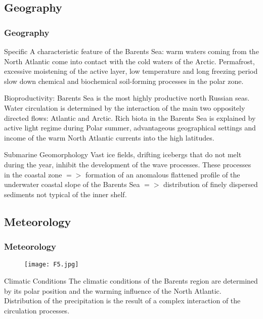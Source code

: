 \documentclass[pdflatex,compress,8pt,
	xcolor={dvipsnames,dvipsnames,svgnames,x11names,table},
	hyperref={	
	breaklinks = true, 
	pdfauthor={Lemenkova Polina}, 
	pdfsubject={Presentation}, 
	pdfcreator={Lemenkova Polina}, 
	pdfproducer={Lemenkova Polina}, 
	colorlinks=true,
	linkcolor=NavyBlue, 
	citecolor=NavyBlue, 
	urlcolor = NavyBlue, 
	breaklinks = true}]{beamer}
\begin{document}
\subsection{Geography}
\begin{frame}\frametitle{Geography}

\begin{block}{Specific}
A characteristic feature of the Barents Sea: warm waters coming from the North Atlantic come into contact with the cold waters of the Arctic. Permafrost, excessive moistening of the active layer, low temperature and long freezing period slow down chemical and biochemical soil-forming processes in the polar zone.
\end{block}

\begin{examples}{Bioproductivity:}
Barents Sea is the most highly productive north Russian seas. Water circulation is determined by the interaction of the main two oppositely directed flows: Atlantic and Arctic. Rich biota in the Barents Sea is explained by active light regime during Polar summer, advantageous geographical settings and income of the warm North Atlantic currents into the high latitudes.
\end{examples}

\begin{alertblock}{Submarine Geomorphology}
Vast ice fields, drifting icebergs that do not melt during the year, inhibit the development of the wave processes.
These processes in the coastal zone $=>$ formation of an \alert{anomalous flattened profile} of the underwater coastal slope of the Barents Sea $=>$ distribution of finely dispersed sediments not typical of the inner shelf.
\end{alertblock}

\end{frame}

\subsection{Meteorology}
\begin{frame}\frametitle{Meteorology}
\begin{figure}[H]
	\centering
		\texttt{[image: F5.jpg]}
\end{figure}

\begin{alertblock}{Climatic Conditions}
The climatic conditions of the Barents region are determined by its polar position and the warming influence of the North Atlantic. Distribution of the precipitation is the result of a complex interaction of the circulation processes.
\end{alertblock}

\end{frame}
\end{document}
